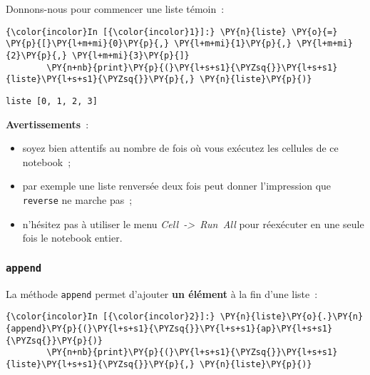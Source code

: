     Donnons-nous pour commencer une liste témoin~:

    \begin{Verbatim}[commandchars=\\\{\},frame=single,framerule=0.3mm,rulecolor=\color{cellframecolor}]
{\color{incolor}In [{\color{incolor}1}]:} \PY{n}{liste} \PY{o}{=} \PY{p}{[}\PY{l+m+mi}{0}\PY{p}{,} \PY{l+m+mi}{1}\PY{p}{,} \PY{l+m+mi}{2}\PY{p}{,} \PY{l+m+mi}{3}\PY{p}{]}
        \PY{n+nb}{print}\PY{p}{(}\PY{l+s+s1}{\PYZsq{}}\PY{l+s+s1}{liste}\PY{l+s+s1}{\PYZsq{}}\PY{p}{,} \PY{n}{liste}\PY{p}{)}
\end{Verbatim}


    \begin{Verbatim}[commandchars=\\\{\},frame=single,framerule=0.3mm,rulecolor=\color{cellframecolor}]
liste [0, 1, 2, 3]
\end{Verbatim}

    \textbf{Avertissements}~:

\begin{itemize}
\tightlist
\item
  soyez bien attentifs au nombre de fois où vous exécutez les cellules
  de ce notebook~;
\item
  par exemple une liste renversée deux fois peut donner l'impression que
  \texttt{reverse} ne marche pas~;
\item
  n'hésitez pas à utiliser le menu \emph{Cell~-\textgreater{}~Run~All}
  pour réexécuter en une seule fois le notebook entier.
\end{itemize}

    \hypertarget{append}{%
\subsubsection{\texorpdfstring{\texttt{append}}{append}}\label{append}}

    La méthode \texttt{append} permet d'ajouter \textbf{un élément} à la fin
d'une liste~:

    \begin{Verbatim}[commandchars=\\\{\},frame=single,framerule=0.3mm,rulecolor=\color{cellframecolor}]
{\color{incolor}In [{\color{incolor}2}]:} \PY{n}{liste}\PY{o}{.}\PY{n}{append}\PY{p}{(}\PY{l+s+s1}{\PYZsq{}}\PY{l+s+s1}{ap}\PY{l+s+s1}{\PYZsq{}}\PY{p}{)}
        \PY{n+nb}{print}\PY{p}{(}\PY{l+s+s1}{\PYZsq{}}\PY{l+s+s1}{liste}\PY{l+s+s1}{\PYZsq{}}\PY{p}{,} \PY{n}{liste}\PY{p}{)}
\end{Verbatim}


